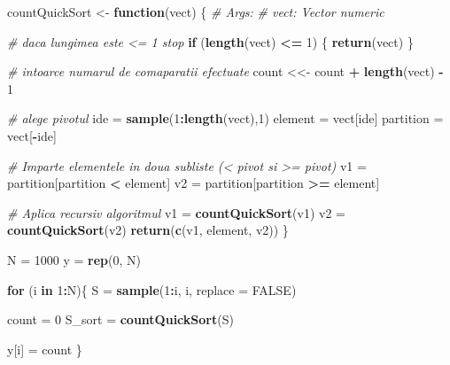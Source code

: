 \documentclass[]{article}
\newenvironment{Shaded}{\begin{snugshade}}{\end{snugshade}}
\newcommand{\KeywordTok}[1]{\textcolor[rgb]{0.13,0.29,0.53}{\textbf{#1}}}
\newcommand{\DataTypeTok}[1]{\textcolor[rgb]{0.13,0.29,0.53}{#1}}
\newcommand{\DecValTok}[1]{\textcolor[rgb]{0.00,0.00,0.81}{#1}}
\newcommand{\StringTok}[1]{\textcolor[rgb]{0.31,0.60,0.02}{#1}}
\newcommand{\CommentTok}[1]{\textcolor[rgb]{0.56,0.35,0.01}{\textit{#1}}}
\newcommand{\OtherTok}[1]{\textcolor[rgb]{0.56,0.35,0.01}{#1}}
\newcommand{\ControlFlowTok}[1]{\textcolor[rgb]{0.13,0.29,0.53}{\textbf{#1}}}
\newcommand{\OperatorTok}[1]{\textcolor[rgb]{0.81,0.36,0.00}{\textbf{#1}}}
\newcommand{\NormalTok}[1]{#1}
\begin{document}
\begin{Shaded}
\begin{Highlighting}[]
\NormalTok{countQuickSort <-}\StringTok{ }\ControlFlowTok{function}\NormalTok{(vect) \{}
  \CommentTok{# Args:}
  \CommentTok{#  vect: Vector numeric}
  
  \CommentTok{# daca lungimea este <= 1 stop}
  \ControlFlowTok{if}\NormalTok{ (}\KeywordTok{length}\NormalTok{(vect) }\OperatorTok{<=}\StringTok{ }\DecValTok{1}\NormalTok{) \{}
    \KeywordTok{return}\NormalTok{(vect)}
\NormalTok{  \}}
  
  \CommentTok{# intoarce numarul de comaparatii efectuate}
\NormalTok{  count <<-}\StringTok{ }\NormalTok{count }\OperatorTok{+}\StringTok{ }\KeywordTok{length}\NormalTok{(vect) }\OperatorTok{-}\StringTok{ }\DecValTok{1} 
  
  \CommentTok{# alege pivotul}
\NormalTok{  ide =}\StringTok{ }\KeywordTok{sample}\NormalTok{(}\DecValTok{1}\OperatorTok{:}\KeywordTok{length}\NormalTok{(vect),}\DecValTok{1}\NormalTok{)}
\NormalTok{  element =}\StringTok{ }\NormalTok{vect[ide]}
\NormalTok{  partition =}\StringTok{ }\NormalTok{vect[}\OperatorTok{-}\NormalTok{ide]}
  
  \CommentTok{# Imparte elementele in doua subliste (< pivot si >= pivot)}
\NormalTok{  v1 =}\StringTok{ }\NormalTok{partition[partition }\OperatorTok{<}\StringTok{ }\NormalTok{element]}
\NormalTok{  v2 =}\StringTok{ }\NormalTok{partition[partition }\OperatorTok{>=}\StringTok{ }\NormalTok{element]}
  
  \CommentTok{# Aplica recursiv algoritmul}
\NormalTok{  v1 =}\StringTok{ }\KeywordTok{countQuickSort}\NormalTok{(v1)}
\NormalTok{  v2 =}\StringTok{ }\KeywordTok{countQuickSort}\NormalTok{(v2)}
  \KeywordTok{return}\NormalTok{(}\KeywordTok{c}\NormalTok{(v1, element, v2))}
\NormalTok{\}}

\NormalTok{N =}\StringTok{ }\DecValTok{1000}
\NormalTok{y =}\StringTok{ }\KeywordTok{rep}\NormalTok{(}\DecValTok{0}\NormalTok{, N)}

\ControlFlowTok{for}\NormalTok{ (i }\ControlFlowTok{in} \DecValTok{1}\OperatorTok{:}\NormalTok{N)\{}
\NormalTok{  S =}\StringTok{ }\KeywordTok{sample}\NormalTok{(}\DecValTok{1}\OperatorTok{:}\NormalTok{i, i, }\DataTypeTok{replace =} \OtherTok{FALSE}\NormalTok{)}
  
\NormalTok{  count =}\StringTok{ }\DecValTok{0}
\NormalTok{  S_sort =}\StringTok{ }\KeywordTok{countQuickSort}\NormalTok{(S)}
  
\NormalTok{  y[i] =}\StringTok{ }\NormalTok{count}
\NormalTok{\}}
\end{Highlighting}
\end{Shaded}
\end{document}
